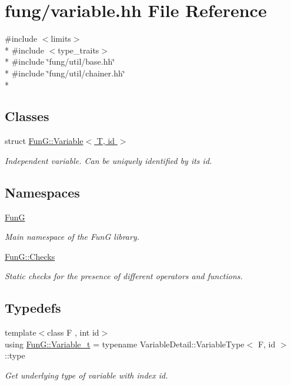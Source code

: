 \hypertarget{variable_8hh}{}\section{fung/variable.hh File Reference}
\label{variable_8hh}
{\ttfamily \#include $<$limits$>$}\\*
{\ttfamily \#include $<$type\+\_\+traits$>$}\\*
{\ttfamily \#include \char`\"{}fung/util/base.\+hh\char`\"{}}\\*
{\ttfamily \#include \char`\"{}fung/util/chainer.\+hh\char`\"{}}\\*
\subsection*{Classes}
\begin{DoxyCompactItemize}
\item 
struct \hyperlink{structFunG_1_1Variable}{Fun\+G\+::\+Variable$<$ T, id $>$}
\begin{DoxyCompactList}\small\item\em Independent variable. Can be uniquely identified by its id. \end{DoxyCompactList}\end{DoxyCompactItemize}
\subsection*{Namespaces}
\begin{DoxyCompactItemize}
\item 
 \hyperlink{namespaceFunG}{Fun\+G}
\begin{DoxyCompactList}\small\item\em Main namespace of the Fun\+G library. \end{DoxyCompactList}\item 
 \hyperlink{namespaceFunG_1_1Checks}{Fun\+G\+::\+Checks}
\begin{DoxyCompactList}\small\item\em Static checks for the presence of different operators and functions. \end{DoxyCompactList}\end{DoxyCompactItemize}
\subsection*{Typedefs}
\begin{DoxyCompactItemize}
\item 
{\footnotesize template$<$class F , int id$>$ }\\using \hyperlink{namespaceFunG_a3d589ef7d011a46a72847eabcbbb4532}{Fun\+G\+::\+Variable\+\_\+t} = typename Variable\+Detail\+::\+Variable\+Type$<$ F, id $>$\+::type
\begin{DoxyCompactList}\small\item\em Get underlying type of variable with index id. \end{DoxyCompactList}\end{DoxyCompactItemize}

